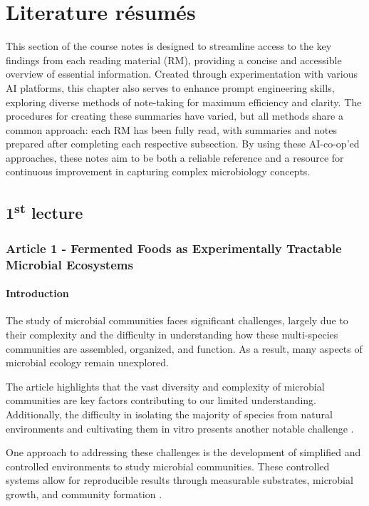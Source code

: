 \chapter{Literature résumés}
\setlength{\headheight}{12.71342pt}
\addtolength{\topmargin}{-0.71342pt}

This section of the course notes is designed to streamline access to the key findings from each reading material (RM), providing a concise and accessible overview of essential information. Created through experimentation with various AI platforms, this chapter also serves to enhance prompt engineering skills, exploring diverse methods of note-taking for maximum efficiency and clarity. The procedures for creating these summaries have varied, but all methods share a common approach: each RM has been fully read, with summaries and notes prepared after completing each respective subsection. By using these AI-co-op'ed approaches, these notes aim to be both a reliable reference and a resource for continuous improvement in capturing complex microbiology concepts.

\section{1\texorpdfstring{\textsuperscript{st}}{st} lecture}
\subsection{Article 1 - Fermented Foods as Experimentally Tractable Microbial Ecosystems}
\subsubsection*{Introduction}
The study of microbial communities faces significant challenges, largely due to their complexity and the difficulty in understanding how these multi-species communities are assembled, organized, and function. As a result, many aspects of microbial ecology remain unexplored.

The article highlights that the vast diversity and complexity of microbial communities are key factors contributing to our limited understanding. Additionally, the difficulty in isolating the majority of species from natural environments and cultivating them in vitro presents another notable challenge \cite*{L1-FermentedFoods}.

One approach to addressing these challenges is the development of simplified and controlled environments to study microbial communities. These controlled systems allow for reproducible results through measurable substrates, microbial growth, and community formation \cite*{L1-FermentedFoods}.

